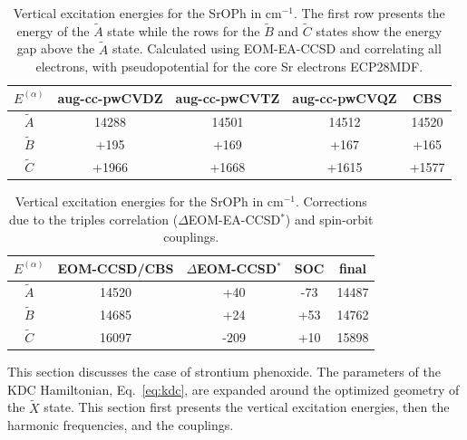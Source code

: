 \documentclass{article}
\begin{document}
\begin{table}
    \center
    \begin{tabular}{|c|c|c|c|c|}
        \hline
    $E ^{(\alpha)}$ & aug-cc-pwCVDZ & aug-cc-pwCVTZ & aug-cc-pwCVQZ & CBS \\
        \hline
    $\tilde{A}$ &   14288 &   14501 &   14512 &   14520 \\
    $\tilde{B}$ &    +195 &    +169 &    +167 &    +165 \\
    $\tilde{C}$ &   +1966 &   +1668 &   +1615 &   +1577 \\
        \hline
    \end{tabular}
    \caption{
        Vertical excitation energies for the SrOPh in cm$^{-1}$. The first row
        presents the energy of the $\tilde{A}$ state while the rows for the
        $\tilde{B}$ and $\tilde{C}$ states show the energy gap above the
        $\tilde{A}$ state. Calculated using EOM-EA-CCSD and correlating all
        electrons, with pseudopotential for the core Sr electrons ECP28MDF.
    }
    \label{tab:sroph_vertical_cbs}
\end{table}

\begin{table}
    \center
    \begin{tabular}{|c|c|c|c|c|}
        \hline
    $E ^{(\alpha)}$ & EOM-CCSD/CBS & $\Delta$EOM-CCSD$^*$ & SOC & final \\
        \hline             
    $\tilde{A}$ &  14520       &  +40 & -73 & 14487 \\
    $\tilde{B}$ &  14685       &  +24 & +53 & 14762 \\
    $\tilde{C}$ &  16097       & -209 & +10 & 15898 \\
        \hline
    \end{tabular}
    \caption{
        Vertical excitation energies for the SrOPh in cm$^{-1}$. Corrections
        due to the triples correlation ($\Delta$EOM-EA-CCSD$^*$) and spin-orbit
        couplings.
    }
    \label{tab:sroph_vertical_dT_SOC}
\end{table}

This section discusses the case of strontium phenoxide. The parameters of the
KDC Hamiltonian, Eq.~\eqref{eq:kdc}, are expanded around the optimized geometry
of the $\tilde{X}$ state. This section first presents the vertical excitation
energies, then the harmonic frequencies, and the couplings.
\end{document}

